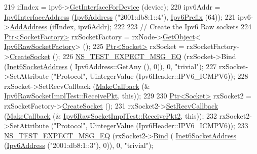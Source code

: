 \begin{DoxyCode}
219   ifIndex = ipv6->\hyperlink{classns3_1_1Ipv6_a3337dc6ce66612b0fa9b57f7f0338745}{GetInterfaceForDevice} (device);
220   ipv6Addr = \hyperlink{classns3_1_1Ipv6InterfaceAddress}{Ipv6InterfaceAddress} (\hyperlink{classns3_1_1Ipv6Address}{Ipv6Address} (\textcolor{stringliteral}{"2001:db8:1::4"}), 
      \hyperlink{classns3_1_1Ipv6Prefix}{Ipv6Prefix} (64));
221   ipv6->\hyperlink{classns3_1_1Ipv6_a5cd576e83cf65445be3a0b5ffd1ddc5c}{AddAddress} (ifIndex, ipv6Addr);
222 
223   \textcolor{comment}{// Create the Ipv6 Raw sockets}
224   \hyperlink{classns3_1_1Ptr}{Ptr<SocketFactory>} rxSocketFactory = rxNode->\hyperlink{classns3_1_1Object_a13e18c00017096c8381eb651d5bd0783}{GetObject}<
      \hyperlink{classns3_1_1Ipv6RawSocketFactory}{Ipv6RawSocketFactory}> ();
225   \hyperlink{classns3_1_1Ptr}{Ptr<Socket>} rxSocket = rxSocketFactory->\hyperlink{classns3_1_1SocketFactory_a97351e6e7860503a4912042530449f62}{CreateSocket} ();
226   \hyperlink{group__testing_ga7304ba46a28d8cf08dfdfd6499cf7068}{NS\_TEST\_EXPECT\_MSG\_EQ} (rxSocket->Bind (\hyperlink{classns3_1_1Inet6SocketAddress}{Inet6SocketAddress} (
      Ipv6Address::GetAny (), 0)), 0, \textcolor{stringliteral}{"trivial"});
227   rxSocket->SetAttribute (\textcolor{stringliteral}{"Protocol"}, UintegerValue (Ipv6Header::IPV6\_ICMPV6));
228   rxSocket->SetRecvCallback (\hyperlink{group__makecallbackmemptr_ga9376283685aa99d204048d6a4b7610a4}{MakeCallback} (&
      \hyperlink{classIpv6RawSocketImplTest_ab85b8a9527dd2f7653cf5431620ff52d}{Ipv6RawSocketImplTest::ReceivePkt}, \textcolor{keyword}{this}));
229 
230   \hyperlink{classns3_1_1Ptr}{Ptr<Socket>} rxSocket2 = rxSocketFactory->\hyperlink{classns3_1_1SocketFactory_a97351e6e7860503a4912042530449f62}{CreateSocket} ();
231   rxSocket2->\hyperlink{classns3_1_1Socket_a243f7835ef1a85f9270fd3577e3a40da}{SetRecvCallback} (\hyperlink{group__makecallbackmemptr_ga9376283685aa99d204048d6a4b7610a4}{MakeCallback} (&
      \hyperlink{classIpv6RawSocketImplTest_a73518b969e0e8a02bdc0bdd8edb07842}{Ipv6RawSocketImplTest::ReceivePkt2}, \textcolor{keyword}{this}));
232   rxSocket2->\hyperlink{classns3_1_1ObjectBase_ac60245d3ea4123bbc9b1d391f1f6592f}{SetAttribute} (\textcolor{stringliteral}{"Protocol"}, UintegerValue (Ipv6Header::IPV6\_ICMPV6));
233   \hyperlink{group__testing_ga7304ba46a28d8cf08dfdfd6499cf7068}{NS\_TEST\_EXPECT\_MSG\_EQ} (rxSocket2->\hyperlink{classns3_1_1Socket_ada93439a43de2028b5a8fc6621dad482}{Bind} (
      \hyperlink{classns3_1_1Inet6SocketAddress}{Inet6SocketAddress} (\hyperlink{classns3_1_1Ipv6Address}{Ipv6Address} (\textcolor{stringliteral}{"2001:db8:1::3"}), 0)), 0, \textcolor{stringliteral}{"trivial"});

\end{DoxyCode}
